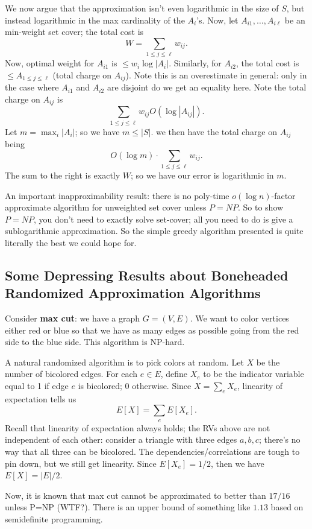 \documentclass{article}
\begin{document}
We now argue that the approximation isn't even logarithmic in the size
of $S$, but instead logarithmic in the max cardinality of the $A_i$'s.
Now, let $A_{i1}, \ldots, A_{i\ell}$ be an min-weight set cover;
the total cost is
$$
W = \sum_{1\leq j \leq \ell} w_{ij}.
$$
Now, optimal weight for $A_{i1}$ is $\leq w_i \log|A_i|$.
Similarly, for $A_{i2}$, the total cost is
$\leq A_{1\leq j \leq \ell}$ (total charge on $A_{ij}$).
Note this is an overestimate in general: only in the case where
$A_{i1}$ and $A_{i2}$ are disjoint do we get an equality here.
Note the total charge on $A_{ij}$ is
$$
\sum_{1\leq j \leq \ell} w_{ij} O(\log |A_{ij}|).
$$
Let $m = \max_i |A_i|$; so we have $m\leq |S|$.
we then have the total charge on $A_{ij}$ being
$$
O(\log m) \cdot \sum_{1\leq j \leq \ell} w_{ij}.
$$
The sum to the right is exactly $W$; so we have our error is
logarithmic in $m$.

An important inapproximability result:
there is no poly-time $o(\log n)$-factor approximate algorithm for
unweighted set cover unless $P=NP$.
So to show $P=NP$, you don't need to exactly solve set-cover; all you need
to do is give a sublogarithmic approximation.
So the simple greedy algorithm presented is quite literally the best we
could hope for.




\subsection{Some Depressing Results about Boneheaded Randomized Approximation Algorithms}

Consider \textbf{max cut}: we have a graph $G=(V,E)$. We want to color vertices 
either
red or blue so that we have as many edges as possible going from the red
side to the blue side.
This algorithm is NP-hard.

A natural randomized algorithm is to pick colors at random.
Let $X$ be the number of bicolored edges.
For each $e\in E$, define $X_e$ to be the indicator variable equal to
1 if edge $e$ is bicolored; 0 otherwise.
Since $X=\sum_e X_e$, linearity of expectation tells us
$$
E[X] =
\sum_e E[X_e].
$$
Recall that linearity of expectation always holds; the RVs above are
not independent of each other: consider a triangle with three edges
$a,b,c$; there's no way that all three can be bicolored.
The dependencies/correlations are tough to pin down, but we still get
linearity.
Since $E[X_e] = 1/2$, then we have $E[X] = |E| / 2$.

Now, it is known that max cut cannot be approximated to better than
$17/16$ unless P=NP (WTF?).
There is an upper bound of something like $1.13$ based on semidefinite
programming.
\end{document}
